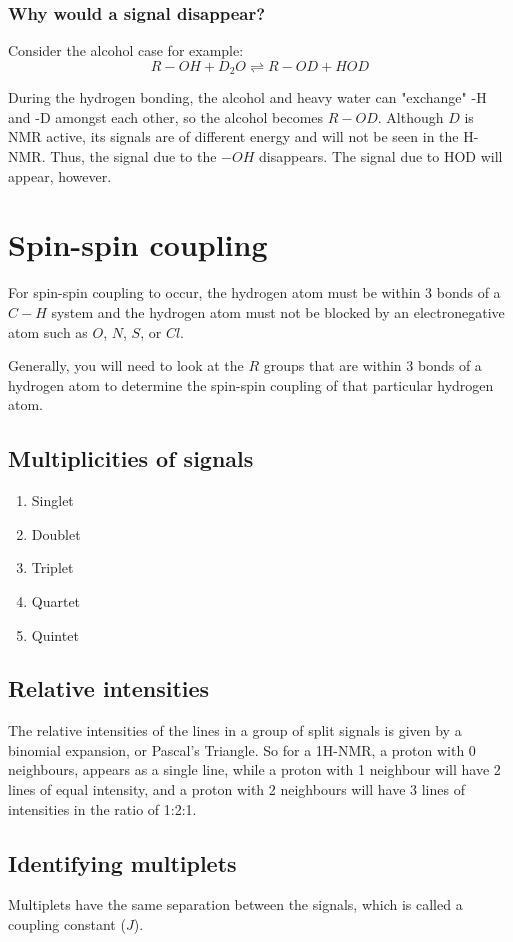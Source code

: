 \documentclass[11pt]{article}
\begin{document}
\subsubsection{Why would a signal disappear?}
\label{sec:org4a8cef1}
Consider the alcohol case for example:
\[R-OH + D_2O \rightleftharpoons R-OD + HOD\]

During the hydrogen bonding, the alcohol and heavy water can "exchange" -H and -D amongst each other, so the alcohol becomes \(R-OD\). Although \(D\) is NMR active, its signals are of different energy and will not be seen in the H-NMR. Thus, the signal due to the \(-OH\) disappears. The signal due to HOD will appear, however.
\section{Spin-spin coupling}
\label{sec:org075a8a3}

For spin-spin coupling to occur, the hydrogen atom must be within 3 bonds of a \(C-H\) system and the hydrogen atom must not be blocked by an electronegative atom such as \(O\), \(N\), \(S\), or \(Cl\).


Generally, you will need to look at the \(R\) groups that are within 3 bonds of a hydrogen atom to determine the spin-spin coupling of that particular hydrogen atom.
\subsection{Multiplicities of signals}
\label{sec:orga3573f6}
\begin{enumerate}
\item Singlet
\item Doublet
\item Triplet
\item Quartet
\item Quintet
\end{enumerate}
\subsection{Relative intensities}
\label{sec:org5594d4f}
The relative intensities of the lines in a group of split signals is given by a binomial expansion, or Pascal's Triangle. So for a 1H-NMR, a proton with 0 neighbours, appears as a single line, while a proton with 1 neighbour will have 2 lines of equal intensity, and a proton with 2 neighbours will have 3 lines of intensities in the ratio of 1:2:1.
\subsection{Identifying multiplets}
\label{sec:org7d5884c}
Multiplets have the same separation between the signals, which is called a coupling constant (\(J\)).
\end{document}
